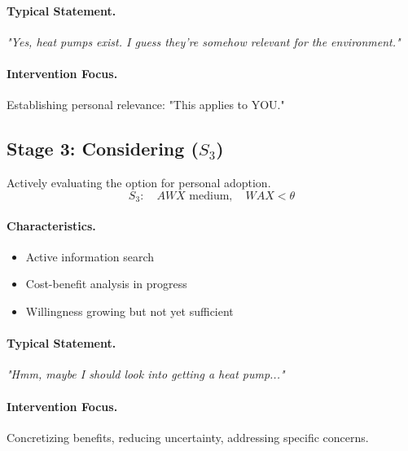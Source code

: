 \paragraph{Typical Statement.}
\textit{"Yes, heat pumps exist. I guess they're somehow relevant for the environment."}

\paragraph{Intervention Focus.}
Establishing personal relevance: "This applies to YOU."

\subsection{Stage 3: Considering ($S_3$)}
\label{sec:bcj-s3}

\begin{definition}
Actively evaluating the option for personal adoption.
\begin{equation}
S_3: \quad AWX \text{ medium}, \quad WAX < \theta
\end{equation}
\end{definition}

\paragraph{Characteristics.}
\begin{itemize}
    \item Active information search
    \item Cost-benefit analysis in progress
    \item Willingness growing but not yet sufficient
\end{itemize}

\paragraph{Typical Statement.}
\textit{"Hmm, maybe I should look into getting a heat pump..."}

\paragraph{Intervention Focus.}
Concretizing benefits, reducing uncertainty, addressing specific concerns.

